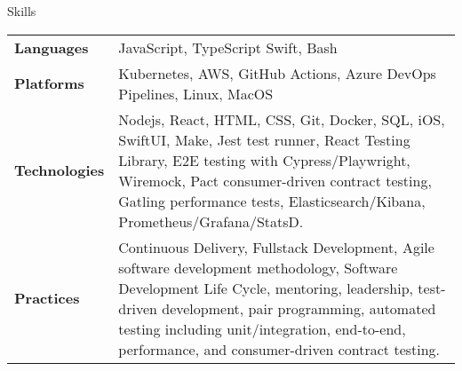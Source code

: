 \begin{section}{Skills}
  \begin{tabularx}{\linewidth}{@{}l X@{}}
    \textbf{Languages} &\small{JavaScript, TypeScript Swift, Bash} \\
    \textbf{Platforms} &\small{Kubernetes, AWS, GitHub Actions, Azure DevOps Pipelines, Linux, MacOS} \\
    \textbf{Technologies} &\small{Nodejs, React, HTML, CSS, Git, Docker, SQL, iOS, SwiftUI, Make, Jest test runner, React Testing Library, E2E testing with Cypress/Playwright, Wiremock, Pact consumer-driven contract testing, Gatling performance tests, Elasticsearch/Kibana, Prometheus/Grafana/StatsD.} \\
    \textbf{Practices} &\small{Continuous Delivery, Fullstack Development, Agile software development methodology, Software Development Life Cycle, mentoring, leadership, test-driven development, pair programming, automated testing including unit/integration, end-to-end, performance, and consumer-driven contract testing.} \\
  \end{tabularx}
\end{section}
